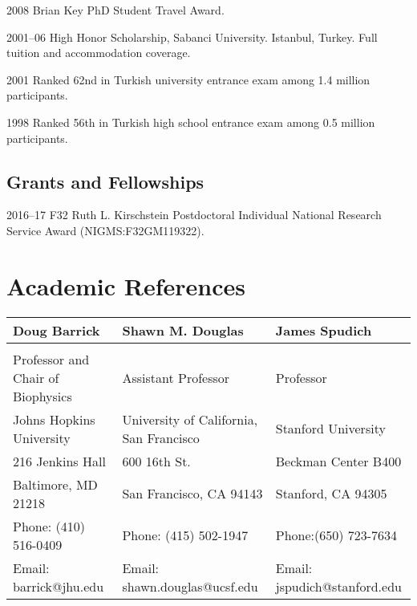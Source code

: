 \documentclass[12pt,letterpaper]{report}
\begin{document}
    \begin{tablist}

        \item[2008] \tab{}Brian Key PhD Student Travel Award.
        \item[2001--06] \tab{}High Honor Scholarship, Sabanci University. Istanbul, Turkey. Full tuition and accommodation coverage.
        \item[2001] \tab{}Ranked 62nd in Turkish university entrance exam among 1.4 million participants.
        \item[1998] \tab{}Ranked 56th in Turkish high school entrance exam among 0.5 million participants.

    \end{tablist}

    \subsection*{Grants and Fellowships}

    \begin{tablist}

        \item[2016--17] \tab{} F32 Ruth L. Kirschstein Postdoctoral Individual National Research Service Award (NIGMS:F32GM119322). 

    \end{tablist}

    \section*{Academic References}

    \begin{tabular}{lll}
        Doug Barrick&  Shawn M. Douglas & James Spudich \\
        \hline \\
        Professor and Chair of Biophysics  & Assistant Professor & Professor \\
        Johns Hopkins University  & University of California, San Francisco & Stanford University \\
        216 Jenkins Hall  & 600 16th St. & Beckman Center B400 \\
        Baltimore, MD 21218  & San Francisco, CA 94143 & Stanford, CA 94305 \\
        Phone: (410) 516-0409 & Phone: (415) 502-1947 & Phone:(650) 723-7634\\
        Email: barrick@jhu.edu  & Email: shawn.douglas@ucsf.edu & Email: jspudich@stanford.edu

    \end{tabular}
\end{document}
